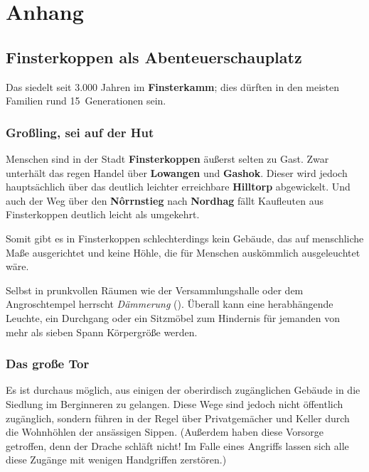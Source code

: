 \spaltenende
\section{Anhang}
\spaltenanfang

\subsection{Finsterkoppen als Abenteuer\-schauplatz}

Das \fkv siedelt seit 3.000 Jahren im \textbf{Finsterkamm}; dies dürften in den meisten Familien rund 15~Generationen sein.

\subsubsection{Großling, sei auf der Hut}
Menschen sind in der Stadt \textbf{Finsterkoppen} äußerst selten zu Gast. Zwar unterhält das \fkv regen Handel über \textbf{Lowangen} und \textbf{Gashok}.
Dieser wird jedoch hauptsächlich über das deutlich leichter erreichbare \textbf{Hilltorp} abgewickelt.
Und auch der Weg über den \textbf{N\^orrnstieg} nach \textbf{Nordhag} fällt Kaufleuten aus Finsterkoppen deutlich leicht als umgekehrt.

Somit gibt es in Finsterkoppen schlechterdings kein Gebäude, das auf menschliche Maße ausgerichtet und keine Höhle, die für Menschen auskömmlich ausgeleuchtet wäre.

Selbst in prunkvollen Räumen wie der Versammlungshalle oder dem Angroschtempel herrscht \emph{Dämmerung} ().
Überall kann eine herabhängende Leuchte, ein Durchgang oder ein Sitzmöbel zum Hindernis für jemanden von mehr als sieben Spann Körpergröße werden.

\subsubsection{Das große Tor}
Es ist durchaus möglich, aus einigen der oberirdisch zugänglichen Gebäude in die Siedlung im Berginneren zu gelangen.
Diese Wege sind jedoch nicht öffentlich zugänglich, sondern führen in der Regel über Privatgemächer und Keller durch die Wohnhöhlen der ansässigen Sippen. 
(Außerdem haben diese Vorsorge getroffen, denn der Drache schläft nicht! Im Falle eines Angriffs lassen sich alle diese Zugänge mit wenigen Handgriffen zerstören.)

